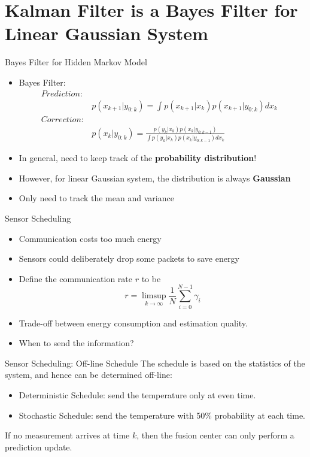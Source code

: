 \documentclass[10pt]{beamer}
\DeclareMathOperator{\1}{\textbf{1}}
\begin{document}
  \section{Kalman Filter is a Bayes Filter for Linear Gaussian System}

\begin{frame}{Bayes Filter for Hidden Markov Model} 
  \begin{itemize}
    \item Bayes Filter:
    \begin{align*}
      Prediction:&&\\
		 &p(x_{k+1}|y_{0:k}) = \int p(x_{k+1}|x_{k})p(x_{k+1}|y_{0:k}) dx_k\\
      Correction:&&\\
		 &p(x_{k}|y_{0:k}) = \frac{ p(y_{k}|x_{k})p(x_{k}|y_{0:k-1})}{\int p(y_{k}|x_{k})p(x_{k}|y_{0:k-1}) dx_k}
    \end{align*}
  \item In general, need to keep track of the {\bf probability distribution}! 
  \item However, for linear Gaussian system, the distribution is always {\bf Gaussian} 
  \item Only need to track the mean and variance
  \end{itemize}
\end{frame}

  \begin{frame}{Sensor Scheduling}
    \begin{itemize}
      \item Communication costs too much energy
      \item Sensors could deliberately drop some packets to save energy
      \item Define the communication rate $r$ to be
	\begin{displaymath}
	  r = \limsup_{k\rightarrow\infty}\frac{1}{N}\sum_{i=0}^{N-1}\gamma_i 
	\end{displaymath}
      \item Trade-off between energy consumption and estimation quality.
      \item When to send the information?
    \end{itemize}
  \end{frame}

  \begin{frame}{Sensor Scheduling: Off-line Schedule}
      The schedule is based on the statistics of the system, and hence can be determined off-line:
    \begin{itemize}
      \item Deterministic Schedule: send the temperature only at even time. 
      \item Stochastic Schedule: send the temperature with 50\% probability at each time. 
    \end{itemize}

    If no measurement arrives at time $k$, then the fusion center can only perform a prediction update.
  \end{frame}
\end{document}
